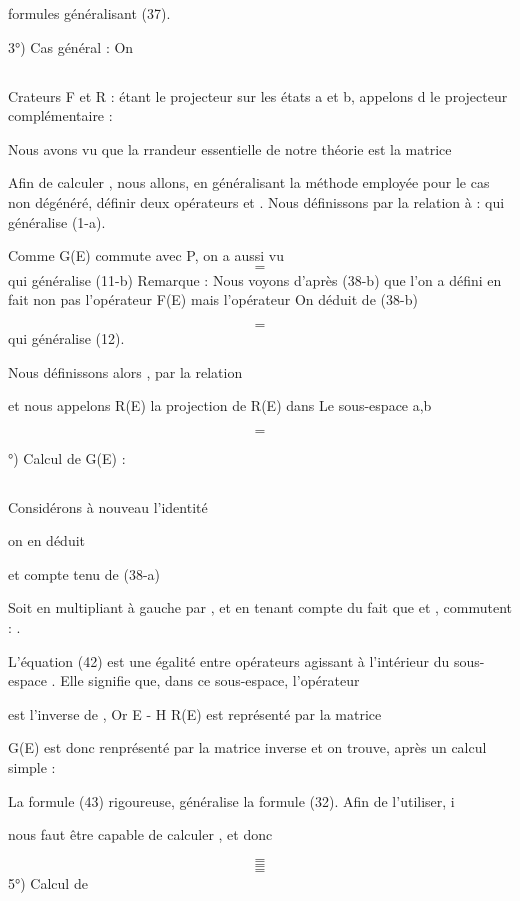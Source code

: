 formules généralisant (37).

3°) Cas général : On
\subsection{}%
Crateurs F et R :
 étant le projecteur sur les états a et b, appelons d le projecteur complémentaire :

Nous avons vu que la rrandeur essentielle de notre théorie est la matrice

Afin de calculer , nous allons, en généralisant la méthode employée
pour le cas non dégénéré, définir deux opérateurs  et .
Nous définissons  par la relation
à : 
qui généralise (1-a).

Comme G(E) commute avec P, on a aussi
vu
\[
\tag{38-b}=
\]
qui généralise (11-b)
Remarque : Nous voyons d'après (38-b) que l'on a défini en fait non pas l'opérateur
F(E) mais l'opérateur
On déduit de (38-b)

\[
\tag{39}=
\]
qui généralise (12).

Nous définissons alors , par la relation

et nous appelons R(E) la projection de R(E) dans Le sous-espace a,b


\[
\tag{43}=
\]

°) Calcul de G(E) :
\subsection{}%
Considérons à nouveau l'identité

on en déduit

et compte tenu de (38-a)

Soit en multipliant à gauche par , et en tenant compte du fait que
 et , commutent : .

L'équation (42) est une égalité entre opérateurs agissant à l'intérieur du
sous-espace . Elle signifie que, dans ce sous-espace, l'opérateur 

est l'inverse de , Or E - H R(E) est représenté par la matrice

G(E) est donc renprésenté par la matrice inverse et on trouve, après un calcul
simple : 

La formule (43) rigoureuse, généralise la formule (32). Afin de l'utiliser, i

nous faut être capable de calculer , et donc 


\[
\tag{45}=
\]
\[
\tag{46}=
\]
\[
\tag{47}=
\]
5°) Calcul de 

